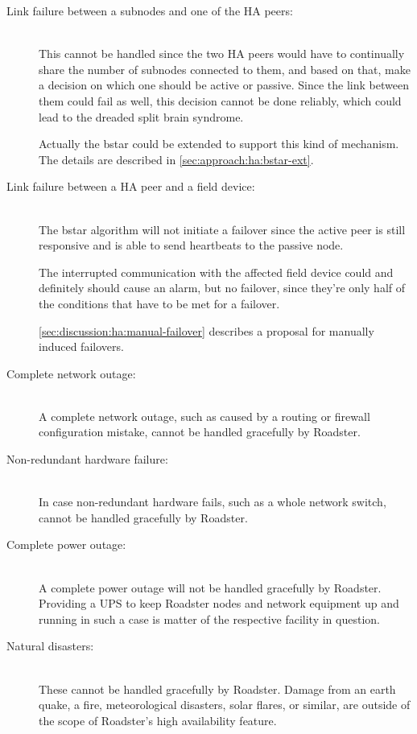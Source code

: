 \begin{description}
	\item [Link failure between a subnodes and one of the HA peers:]\hfill\\

		This cannot be handled since the two HA peers would have to
		continually share the number of subnodes connected to them, and
		based on that, make a decision on which one should be active or
		passive. Since the link between them could fail as well, this
		decision cannot be done reliably, which could lead to the
		dreaded split brain syndrome.

		Actually the \gls{bstar} could be extended to support this kind
		of mechanism. The details are described in
		\autoref{sec:approach:ha:bstar-ext}.


	\item [Link failure between a HA peer and a field device:]\hfill\\
		The \gls{bstar} algorithm will not initiate a failover since the
		active peer is still responsive and is able to send heartbeats to the passive node.

		The interrupted communication with the affected field device
		could and definitely should cause an alarm, but no failover,
		since they're only half of the conditions that have to be met
		for a failover.

		\autoref{sec:discussion:ha:manual-failover} describes a
		proposal for manually induced failovers.

	\item [ Complete network outage:]\hfill\\
		A complete network outage, such as caused by a routing or
		firewall configuration mistake, cannot be handled gracefully by
		Roadster.

	\item [ Non-redundant hardware failure:]\hfill\\
		In case non-redundant hardware fails, such as a whole network
		switch, cannot be handled gracefully by Roadster.

	\item [ Complete power outage:]\hfill\\
		A complete power outage will not be handled gracefully by
		Roadster. Providing a \gls{UPS} to keep Roadster nodes and
		network equipment up and running in such a case is matter of
		the respective facility in question.

	\item [ Natural disasters:]\hfill\\
		These cannot be handled gracefully by Roadster. Damage from an
		earth quake, a fire, meteorological disasters, solar flares, or
		similar, are outside of the scope of Roadster's high
		availability feature.
\end{description}

